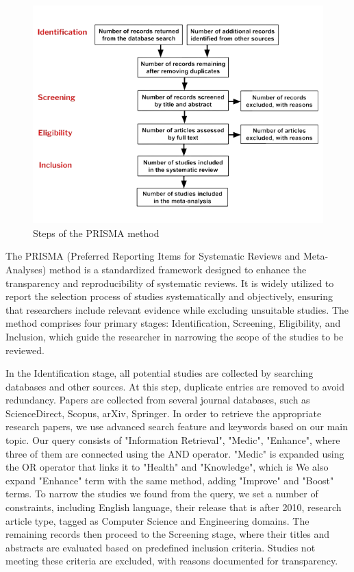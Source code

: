 \documentclass[conference]{IEEEtran}
\begin{document}
\begin{figure}[ht!]
    \centering
    \includegraphics[scale=.4]{PRISMA.png}
    \caption{Steps of the PRISMA method}
    \label{fig:PRISMA}
\end{figure}

The PRISMA (Preferred Reporting Items for Systematic Reviews and Meta-Analyses) method is a standardized framework designed to enhance the transparency and reproducibility of systematic reviews. It is widely utilized to report the selection process of studies systematically and objectively, ensuring that researchers include relevant evidence while excluding unsuitable studies. The method comprises four primary stages: Identification, Screening, Eligibility, and Inclusion, which guide the researcher in narrowing the scope of the studies to be reviewed.

In the Identification stage, all potential studies are collected by searching databases and other sources. At this step, duplicate entries are removed to avoid redundancy. Papers are collected from several journal databases, such as ScienceDirect, Scopus, arXiv, Springer. In order to retrieve the appropriate research papers, we use advanced search feature and keywords based on our main topic. Our query consists of "Information Retrieval", "Medic", "Enhance", where three of them are connected using the AND operator. "Medic" is expanded using the OR operator that links it to "Health" and "Knowledge", which is We also expand "Enhance" term with the same method, adding "Improve" and "Boost" terms. To narrow the studies we found from the query, we set a number of constraints, including English language, their release that is after 2010, research article type, tagged as Computer Science and Engineering domains. The remaining records then proceed to the Screening stage, where their titles and abstracts are evaluated based on predefined inclusion criteria. Studies not meeting these criteria are excluded, with reasons documented for transparency.
\end{document}
